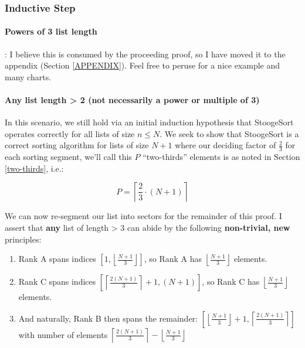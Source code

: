 \documentclass[conference]{styles/acmsiggraph}
\newcommand{\?}{\stackrel{?}{=}}
\newcommand\subsubsubsection{\paragraph}
\begin{document}
\subsubsection{Inductive Step}

\subsubsubsection{Powers of 3 list length}: I believe this is consumed by the proceeding proof, so I have moved it to the appendix (Section \ref{APPENDIX}).  Feel free to peruse for a nice example and many charts.





\subsubsubsection{Any list length > 2 (not necessarily a power or multiple of 3)} In this scenario, we still hold via an initial induction hypothesis that StoogeSort operates correctly for all lists of size $n \leq N$.  We seek to show that StoogeSort is a correct sorting algorithm for lists of size $N+1$ where our deciding factor of $\frac{2}{3}$ for each sorting segment, we'll call this $P$ \enquote{two-thirds} elements is as noted in Section \ref{two-thirds}, i.e.:

$$P = \left\lceil\frac{2}{3}\cdot (N+1)\right\rceil$$

We can now re-segment our list into sectors for the remainder of this proof.  I assert that \textbf{any} list of length > 3 can abide by the following \textbf{non-trivial, new} principles: \\

\begin{enumerate}
    \item Rank A spans indices $\left [1, \left \lfloor \frac{N+1}{3}  \right \rfloor \right]$, so Rank A has $\left \lfloor \frac{N+1}{3}  \right \rfloor$ elements. \\
    \item Rank C spans indices $\left [ \left \lceil \frac{2(N+1)}{3} \right \rceil +1, (N+1) \right]$, so Rank C has $\left \lfloor \frac{N+1}{3}  \right \rfloor$ elements. \\
    \item And naturally, Rank B then spans the remainder: $\left [\left \lfloor \frac{N+1}{3}  \right \rfloor +1, \left \lceil \frac{2(N+1)}{3} \right \rceil \right]$ \\with number of elements $\left \lceil \frac{2(N+1)}{3} \right \rceil - \left \lfloor \frac{N+1}{3}  \right \rfloor$\\
\end{enumerate}
\end{document}
